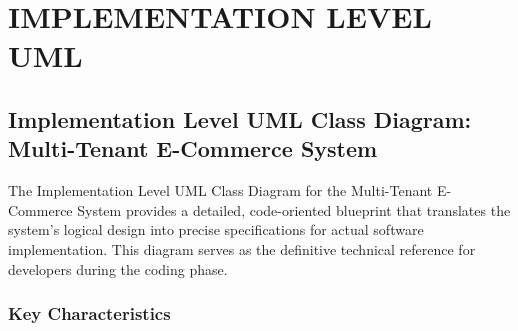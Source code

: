 \chapter{IMPLEMENTATION LEVEL UML} \label{ch:procedure}

\section{Implementation Level UML Class Diagram: Multi-Tenant E-Commerce System}

The Implementation Level UML Class Diagram for the Multi-Tenant E-Commerce System provides a detailed, code-oriented blueprint that translates the system's logical design into precise specifications for actual software implementation. This diagram serves as the definitive technical reference for developers during the coding phase.

\subsection*{Key Characteristics}

